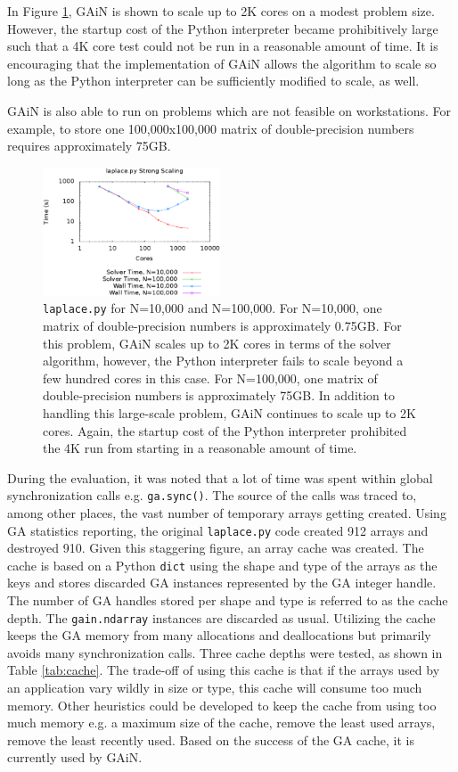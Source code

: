 \documentclass{sigplanconf}
\begin{document}
In Figure \ref{fig:laplace}, GAiN is shown to scale up to 2K cores on a modest
problem size. However, the startup cost of the Python interpreter became
prohibitively large such that a 4K core test could not be run in a reasonable
amount of time. It is encouraging that the implementation of GAiN allows the
algorithm to scale so long as the Python interpreter can be sufficiently
modified to scale, as well.

GAiN is also able to run on problems which are not feasible on workstations.
For example, to store one 100,000x100,000 matrix of double-precision numbers
requires approximately 75GB. 

\begin{figure}[htb]
\centering
\includegraphics[width=0.47\textwidth]{laplace.eps}
\caption{
\texttt{laplace.py} for N=10,000 and N=100,000. For N=10,000, one matrix
of double-precision numbers is approximately 0.75GB. For this problem, GAiN
scales up to 2K cores in terms of the solver algorithm, however, the Python
interpreter fails to scale beyond a few hundred cores in this case. For
N=100,000, one matrix of double-precision numbers is approximately 75GB. In
addition to handling this large-scale problem, GAiN continues to scale up to
2K cores. Again, the startup cost of the Python interpreter prohibited the 4K
run from starting in a reasonable amount of time.
}
\label{fig:laplace}
\end{figure}

During the evaluation, it was noted that a lot of time was spent within global
synchronization calls e.g. \verb=ga.sync()=. The source of the calls was
traced to, among other places, the vast number of temporary arrays getting
created.  Using GA statistics reporting, the original \verb=laplace.py= code
created 912 arrays and destroyed 910. Given this staggering figure, an array
cache was created. The cache is based on a Python \verb=dict= using the shape
and type of the arrays as the keys and stores discarded GA instances
represented by the GA integer handle. The number of GA handles stored per
shape and type is referred to as the cache depth. The \verb=gain.ndarray=
instances are discarded as usual.  Utilizing the cache keeps the GA memory
from many allocations and deallocations but primarily avoids many
synchronization calls. Three cache depths were tested, as shown in Table
\ref{tab:cache}. The trade-off of using this cache is that if the arrays used
by an application vary wildly in size or type, this cache will consume too
much memory. Other heuristics could be developed to keep the cache from using
too much memory e.g. a maximum size of the cache, remove the least used
arrays, remove the least recently used.  Based on the success of the GA cache,
it is currently used by GAiN.
\end{document}
